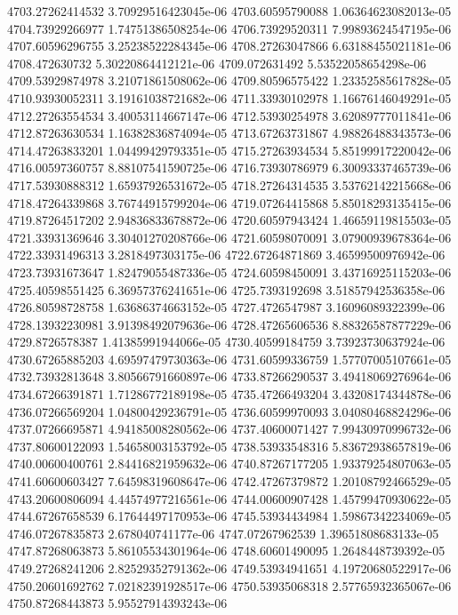 {4703.27262414532 3.70929516423045e-06
4703.60595790088 1.06364623082013e-05
4704.73929266977 1.74751386508254e-06
4706.73929520311 7.99893624547195e-06
4707.60596296755 3.25238522284345e-06
4708.27263047866 6.63188455021181e-06
4708.472630732 5.30220864412121e-06
4709.072631492 5.53522058654298e-06
4709.53929874978 3.21071861508062e-06
4709.80596575422 1.23352585617828e-05
4710.93930052311 3.19161038721682e-06
4711.33930102978 1.16676146049291e-05
4712.27263554534 3.40053114667147e-06
4712.53930254978 3.62089777011841e-06
4712.87263630534 1.16382836874094e-05
4713.67263731867 4.98826488343573e-06
4714.47263833201 1.04499429793351e-05
4715.27263934534 5.85199917220042e-06
4716.00597360757 8.88107541590725e-06
4716.73930786979 6.30093337465739e-06
4717.53930888312 1.65937926531672e-05
4718.27264314535 3.53762142215668e-06
4718.47264339868 3.76744915799204e-06
4719.07264415868 5.85018293135415e-06
4719.87264517202 2.94836833678872e-06
4720.60597943424 1.46659119815503e-05
4721.33931369646 3.30401270208766e-06
4721.60598070091 3.07900939678364e-06
4722.33931496313 3.2818497303175e-06
4722.67264871869 3.46599500976942e-06
4723.73931673647 1.82479055487336e-05
4724.60598450091 3.43716925115203e-06
4725.40598551425 6.36957376241651e-06
4725.7393192698 3.51857942536358e-06
4726.80598728758 1.63686374663152e-05
4727.4726547987 3.16096089322399e-06
4728.13932230981 3.91398492079636e-06
4728.47265606536 8.88326587877229e-06
4729.8726578387 1.41385991944066e-05
4730.40599184759 3.73923730637924e-06
4730.67265885203 4.69597479730363e-06
4731.60599336759 1.57707005107661e-05
4732.73932813648 3.80566791660897e-06
4733.87266290537 3.49418069276964e-06
4734.67266391871 1.71286772189198e-05
4735.47266493204 3.43208174344878e-06
4736.07266569204 1.04800429236791e-05
4736.60599970093 3.04080468824296e-06
4737.07266695871 4.94185008280562e-06
4737.40600071427 7.99430970996732e-06
4737.80600122093 1.54658003153792e-05
4738.53933548316 5.83672938657819e-06
4740.00600400761 2.84416821959632e-06
4740.87267177205 1.93379254807063e-05
4741.60600603427 7.64598319608647e-06
4742.47267379872 1.20108792466529e-05
4743.20600806094 4.44574977216561e-06
4744.00600907428 1.45799470930622e-05
4744.67267658539 6.17644497170953e-06
4745.53934434984 1.59867342234069e-05
4746.07267835873 2.678040741177e-06
4747.07267962539 1.39651808683133e-05
4747.87268063873 5.86105534301964e-06
4748.60601490095 1.2648448739392e-05
4749.27268241206 2.82529352791362e-06
4749.53934941651 4.19720680522917e-06
4750.20601692762 7.02182391928517e-06
4750.53935068318 2.57765932365067e-06
4750.87268443873 5.95527914393243e-06
}
